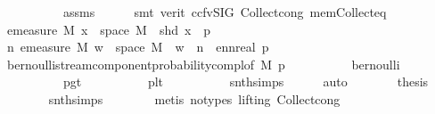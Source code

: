 \begin{isabellebody}
\ \ \ \ \ \ \ \ \ \ assms\isanewline
\ \ \ \ \isamarkupfalse%
\ {\isacharparenleft}{\kern0pt}smt\ {\isacharparenleft}{\kern0pt}verit{\isacharcomma}{\kern0pt}\ ccfv{\isacharunderscore}{\kern0pt}SIG{\isacharparenright}{\kern0pt}\ Collect{\isacharunderscore}{\kern0pt}cong\ mem{\isacharunderscore}{\kern0pt}Collect{\isacharunderscore}{\kern0pt}eq{\isacharparenright}{\kern0pt}\isanewline
\ \ \isamarkupfalse%
\ \isamarkupfalse%
\ {\isachardoublequoteopen}emeasure\ M\ {\isacharbraceleft}{\kern0pt}x\ {\isasymin}\ space\ M{\isachardot}{\kern0pt}\ {\isasymnot}\ shd\ x{\isacharbraceright}{\kern0pt}\ {\isacharequal}{\kern0pt}\ {}{\isacharminus}{\kern0pt}p{\isachardoublequoteclose}\isanewline
\ \ \isamarkupfalse%
{\isacharminus}{\kern0pt}\isanewline
\ \ \ \ \isamarkupfalse%
\ {\isachardoublequoteopen}{\isasymforall}n{\isachardot}{\kern0pt}\ emeasure\ M\ {\isacharbraceleft}{\kern0pt}w\ {\isasymin}\ space\ M{\isachardot}{\kern0pt}\ {\isasymnot}\ w\ {\isacharbang}{\kern0pt}{\isacharbang}{\kern0pt}\ n{\isacharbraceright}{\kern0pt}\ {\isacharequal}{\kern0pt}\ ennreal\ {\isacharparenleft}{\kern0pt}{}{\isacharminus}{\kern0pt}p{\isacharparenright}{\kern0pt}{\isachardoublequoteclose}\isanewline
\ \ \ \ \ \ \isamarkupfalse%
\ bernoulli{\isacharunderscore}{\kern0pt}stream{\isacharunderscore}{\kern0pt}component{\isacharunderscore}{\kern0pt}probability{\isacharunderscore}{\kern0pt}compl{\isacharbrackleft}{\kern0pt}of\ M\ p{\isacharbrackright}{\kern0pt}\isanewline
\ \ \ \ \ \ \ \ \ \ bernoulli\isanewline
\ \ \ \ \ \ \ \ \ \ p{\isacharunderscore}{\kern0pt}gt{\isacharunderscore}{\kern0pt}{}\isanewline
\ \ \ \ \ \ \ \ \ \ p{\isacharunderscore}{\kern0pt}lt{\isacharunderscore}{\kern0pt}{}\isanewline
\ \ \ \ \ \ \ \ \ \ snth{\isachardot}{\kern0pt}simps{\isacharparenleft}{\kern0pt}{}{\isacharparenright}{\kern0pt}\isanewline
\ \ \ \ \isamarkupfalse%
\ auto\isanewline
\ \ \ \ \isamarkupfalse%
\ \isamarkupfalse%
\ {\isacharquery}{\kern0pt}thesis\isanewline
\ \ \ \ \ \ \isamarkupfalse%
\ snth{\isachardot}{\kern0pt}simps{\isacharparenleft}{\kern0pt}{}{\isacharparenright}{\kern0pt}\isanewline
\ \ \ \ \ \ \isamarkupfalse%
\ {\isacharparenleft}{\kern0pt}metis\ {\isacharparenleft}{\kern0pt}no{\isacharunderscore}{\kern0pt}types{\isacharcomma}{\kern0pt}\ lifting{\isacharparenright}{\kern0pt}\ Collect{\isacharunderscore}{\kern0pt}cong{\isacharparenright}{\kern0pt}\isanewline

\end{isabellebody}
